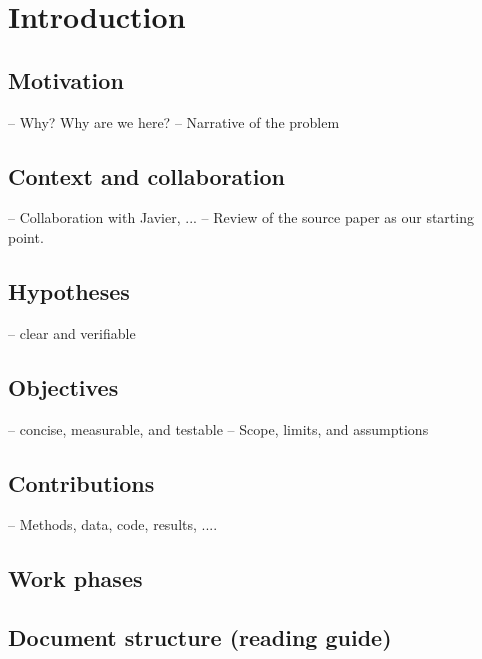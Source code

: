 \chapter{Introduction}\label{chap:introduction}

\section{Motivation}\label{sec:motivation}
-- Why? Why are we here?
-- Narrative of the problem

\section{Context and collaboration}\label{sec:context-collaboration}
-- Collaboration with Javier, ...
-- Review of the source paper as our starting point.

\section{Hypotheses}\label{sec:hypotheses}
-- clear and verifiable

\section{Objectives}\label{sec:objectives}
-- concise, measurable, and testable
-- Scope, limits, and assumptions

\section{Contributions}\label{sec:contributions}
-- Methods, data, code, results, ....

\section{Work phases}\label{sec:methodology}

\section{Document structure (reading guide)}\label{sec:doc-structure}
